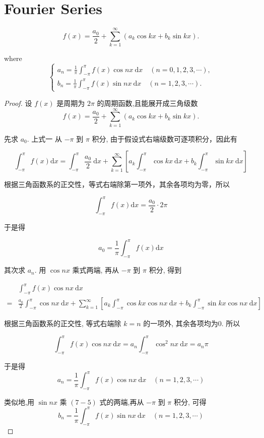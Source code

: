 \section{Fourier Series}

\begin{definition}[傅里叶级数]
    $$
f(x)=\frac{a_{0}}{2}+\sum_{k=1}^{\infty}\left(a_{k} \cos k x+b_{k} \sin k x\right) .
$$

where $$ \left\{\begin{array}{l}a_{n}=\frac{1}{\pi} \int_{-\pi}^{\pi} f(x) \cos n x \mathrm{~d} x \quad(n=0,1,2,3, \cdots), \\ b_{n}=\frac{1}{\pi} \int_{-\pi}^{\pi} f(x) \sin n x \mathrm{~d} x \quad(n=1,2,3, \cdots) .\end{array}\right. $$
\end{definition}

\begin{proof}
    设 $ f(x) $ 是周期为 $ 2 \pi $ 的周期函数,且能展开成三角级数
$$
f(x)=\frac{a_{0}}{2}+\sum_{k=1}^{\infty}\left(a_{k} \cos k x+b_{k} \sin k x\right) .
$$

先求 $ a_{0} $. 上式一 从 $ -\pi $ 到 $ \pi $ 积分, 由于假设式右端级数可逐项积分，因此有

$$ \int_{-\pi}^{\pi} f(x) \mathrm{d} x=\int_{-\pi}^{\pi} \frac{a_{0}}{2} \mathrm{~d} x+\sum_{k=1}^{\infty}\left[a_{k} \int_{-\pi}^{\pi} \cos k x \mathrm{~d} x+b_{k} \int_{-\pi}^{\pi} \sin k x \mathrm{~d} x\right] $$

根据三角函数系的正交性，等式右端除第一项外，其余各项均为零，所以

$$ \int_{-\pi}^{\pi} f(x) \mathrm{d} x=\frac{a_{0}}{2} \cdot 2 \pi $$

于是得

$$ a_{0}=\frac{1}{\pi} \int_{-\pi}^{\pi} f(x) \mathrm{d} x $$

其次求 $ a_{n} . $ 用 $ \cos n x $ 乘式两端, 再从 $ -\pi $ 到 $ \pi $ 积分, 得到

$$ \begin{aligned}  &\int_{-\pi}^{\pi} f(x) \cos n x \mathrm{~d} x\\ =&\frac{a_{0}}{2} \int_{-\pi}^{\pi} \cos n x \mathrm{~d} x+\sum_{k=1}^{\infty}\left[a_{k} \int_{-\pi}^{\pi} \cos k x \cos n x \mathrm{~d} x+b_{k} \int_{-\pi}^{\pi} \sin k x \cos n x \mathrm{~d} x\right] \end{aligned} $$

根据三角函数系的正交性, 等式右端除 $ k=n $ 的一项外, 其余各项均为0. 所以

$$ \int_{-\pi}^{\pi} f(x) \cos n x \mathrm{~d} x=a_{n} \int_{-\pi}^{\pi} \cos ^{2} n x \mathrm{~d} x=a_{n} \pi $$

于是得$$ a_{n}=\frac{1}{\pi} \int_{-\pi}^{\pi} f(x) \cos n x \mathrm{~d} x \quad(n=1,2,3, \cdots) $$

类似地,用 $ \sin n x $ 乘 $ (7-5) $ 式的两端,再从 $ -\pi $ 到 $ \pi $ 积分, 可得
$$
b_{n}=\frac{1}{\pi} \int_{-\pi}^{\pi} f(x) \sin n x \mathrm{~d} x \quad(n=1,2,3, \cdots)
$$
\end{proof}

